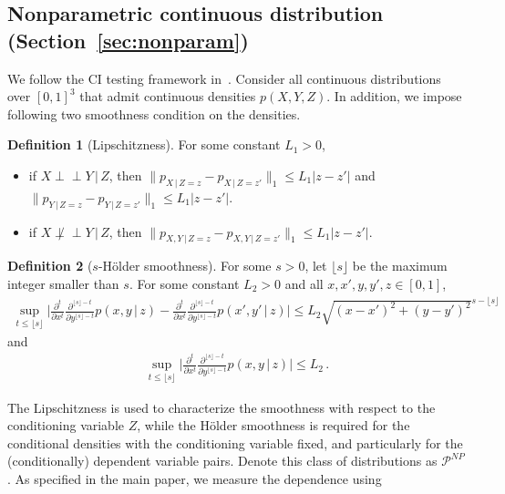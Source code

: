\documentclass{article}
\theoremstyle{definition}
\newtheorem{definition}{Definition}
\theoremstyle{definition}
\theoremstyle{definition}
\theoremstyle{definition}
\theoremstyle{definition}
\theoremstyle{definition}
\theoremstyle{remark}
\theoremstyle{remark}
\newcommand{\given}{\,|\,}
\newcommand{\indep}{\perp \!\!\! \perp }
\begin{document}
\subsection{Nonparametric continuous distribution (Section~\ref{sec:nonparam})}\label{app:details:np}
We follow the CI testing framework in~\citet{neykov2021minimax}.
Consider all continuous distributions over $[0,1]^3$ that admit continuous densities $p(X,Y,Z)$. 
In addition, we impose following two smoothness condition on the densities. 
\begin{definition}[Lipschitzness]\label{defn:lip}
    For some constant $L_1>0$, 
    \begin{itemize}
        \item if $X\indep Y\given Z$, then $\|p_{X\given Z=z} - p_{X\given Z=z'}\|_1 \le L_1 |z - z'|$ and $\|p_{Y\given Z=z} - p_{Y\given Z=z'}\|_1 \le L_1 |z - z'|$.
        \item if $X\not\indep Y\given Z$, then $\|p_{X,Y\given Z=z} - p_{X,Y\given Z=z'}\|_1 \le L_1 |z - z'|$.
    \end{itemize}
\end{definition}
\begin{definition}[$s$-H\"older smoothness]\label{defn:holder}
    For some $s>0$, let $\lfloor s \rfloor$ be the maximum integer smaller than $s$. For some constant $L_2>0$ and all $x,x',y,y',z\in[0,1]$,
    \begin{align*}
        \sup_{t\le \lfloor s \rfloor}\bigg|\frac{\partial^t}{\partial x^t}\frac{\partial^{\lfloor s \rfloor-t}}{\partial y^{\lfloor s \rfloor-t}}p(x,y\given z) - \frac{\partial^t}{\partial x^t}\frac{\partial^{\lfloor s \rfloor-t}}{\partial y^{\lfloor s \rfloor-t}}p(x',y'\given z)\bigg| \le L_2\sqrt{(x-x')^2 + (y-y')^2}^{s-\lfloor s \rfloor}
    \end{align*}
    and 
    \begin{align*}
        \sup_{t\le \lfloor s \rfloor}\bigg|\frac{\partial^t}{\partial x^t}\frac{\partial^{\lfloor s \rfloor-t}}{\partial y^{\lfloor s \rfloor-t}}p(x,y\given z)\bigg| \le L_2 \,.
    \end{align*}
\end{definition}
\noindent
The Lipschitzness is used to characterize the smoothness with respect to the conditioning variable $Z$, while the H\"older smoothness is required for the conditional densities with the conditioning variable fixed, and particularly for the (conditionally) dependent variable pairs. 
Denote this class of distributions as $\mathcal{P}^{NP}$. As specified in the main paper, we measure the dependence using
\end{document}
